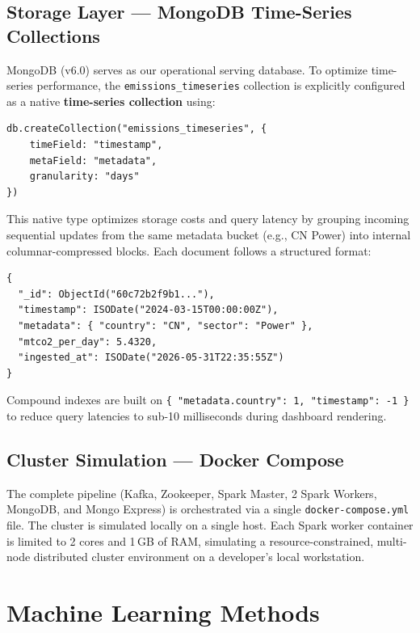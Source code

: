 \documentclass[conference]{IEEEtran}
\begin{document}
\subsection{Storage Layer — MongoDB Time-Series Collections}
MongoDB (v6.0) serves as our operational serving database. To optimize time-series performance, the \texttt{emissions\_timeseries} collection is explicitly configured as a native \textbf{time-series collection} using:
\begin{verbatim}
db.createCollection("emissions_timeseries", {
    timeField: "timestamp",
    metaField: "metadata",
    granularity: "days"
})
\end{verbatim}
This native type optimizes storage costs and query latency by grouping incoming sequential updates from the same metadata bucket (e.g., CN Power) into internal columnar-compressed blocks. Each document follows a structured format:
\begin{verbatim}
{
  "_id": ObjectId("60c72b2f9b1..."),
  "timestamp": ISODate("2024-03-15T00:00:00Z"),
  "metadata": { "country": "CN", "sector": "Power" },
  "mtco2_per_day": 5.4320,
  "ingested_at": ISODate("2026-05-31T22:35:55Z")
}
\end{verbatim}
Compound indexes are built on \texttt{\{ "metadata.country": 1, "timestamp": -1 \}} to reduce query latencies to sub-10 milliseconds during dashboard rendering.

\subsection{Cluster Simulation — Docker Compose}
The complete pipeline (Kafka, Zookeeper, Spark Master, 2 Spark Workers, MongoDB, and Mongo Express) is orchestrated via a single \texttt{docker-compose.yml} file. The cluster is simulated locally on a single host. Each Spark worker container is limited to 2 cores and 1\,GB of RAM, simulating a resource-constrained, multi-node distributed cluster environment on a developer's local workstation.

\section{Machine Learning Methods}
\end{document}
